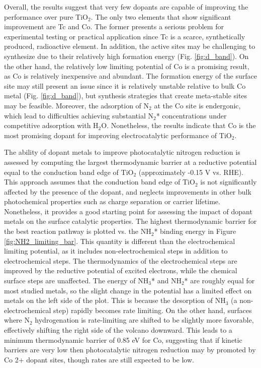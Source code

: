 Overall, the results suggest that very few dopants are capable of improving the performance over pure TiO$_2$. The only two elements that show significant improvement are Tc and Co. The former presents a serious problem for experimental testing or practical application since Tc is a scarce, synthetically produced, radioactive element. In addition, the active sites may be challenging to synthesize due to their relatively high formation energy (Fig. \ref{fig:d_band}). On the other hand, the relatively low limiting potential of Co is a promising result, as Co is relatively inexpensive and abundant. The formation energy of the surface site may still present an issue since it is relatively unstable relative to bulk Co metal (Fig. \ref{fig:d_band}), but synthesis strategies that create meta-stable sites may be feasible. Moreover, the adsorption of N$_2$ at the Co site is endergonic, which lead to difficulties achieving substantial N$_2$* concentrations under competitive adsorption with H$_2$O. Nonetheless, the results indicate that Co is the most promising dopant for improving electrocatalytic performance of TiO$_2$.

The ability of dopant metals to improve photocatalytic nitrogen reduction is assessed by computing the largest thermodynamic barrier at a reductive potential equal to the conduction band edge of TiO$_2$ (approximately -0.15 V vs. RHE). This approach assumes that the conduction band edge of TiO$_2$ is not significantly affected by the presence of the dopant, and neglects improvements in other bulk photochemical properties such as charge separation or carrier lifetime. Nonetheless, it provides a good starting point for assessing the impact of dopant metals on the surface catalytic properties.
The highest thermodynamic barrier for the best reaction pathway is plotted vs. the NH$_2$* binding energy in Figure \ref{fig:NH2_limiting_bar}. This quantity is different than the electrochemical limiting potential, as it includes non-electrochemical steps in addition to electrochemical steps. The thermodynamics of the electrochemical steps are improved by the reductive potential of excited electrons, while the chemical surface steps are unaffected. The energy of NH$_3$* and  NH$_2$* are roughly equal for most studied metals, so the slight change in the potential has a limited effect on metals on the left side of the plot. This is because the desorption of NH$_3$ (a non-electrochemical step) rapidly becomes rate limiting. On the other hand, surfaces where N$_2$ hydrogenation is rate-limiting are shifted to be slightly more favorable, effectively shifting the right side of the volcano downward. This leads to a minimum thermodynamic barrier of 0.85 eV for Co, suggesting that if kinetic barriers are very low then photocatalytic nitrogen reduction may by promoted by Co 2+ dopant sites, though rates are still expected to be low. 

